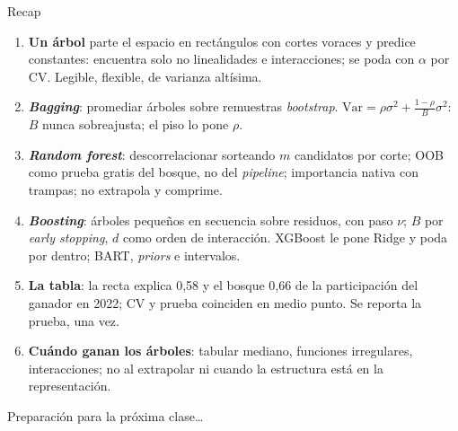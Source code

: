 \documentclass{beamer}
\newcommand{\Var}{\mathrm{Var}}
\newcommand{\1}{\mathbb{I}}
\begin{document}
\begin{frame}{Recap}
\small
\begin{enumerate}\itemsep3pt
  \item \textbf{Un árbol} parte el espacio en rectángulos con cortes voraces y predice constantes: encuentra solo no linealidades e interacciones; se poda con $\alpha$ por CV. Legible, flexible, de varianza altísima.
  \item \textbf{\emph{Bagging}}: promediar árboles sobre remuestras \emph{bootstrap}. $\Var = \rho\sigma^2 + \frac{1-\rho}{B}\sigma^2$: $B$ nunca sobreajusta; el piso lo pone $\rho$.
  \item \textbf{\emph{Random forest}}: descorrelacionar sorteando $m$ candidatos por corte; OOB como prueba gratis del bosque, no del \emph{pipeline}; importancia nativa con trampas; no extrapola y comprime.
  \item \textbf{\emph{Boosting}}: árboles pequeños en secuencia sobre residuos, con paso $\nu$; $B$ por \emph{early stopping}, $d$ como orden de interacción. XGBoost le pone Ridge y poda por dentro; BART, \emph{priors} e intervalos.
  \item \textbf{La tabla}: la recta explica 0,58 y el bosque 0,66 de la participación del ganador en 2022; CV y prueba coinciden en medio punto. Se reporta la prueba, una vez.
  \item \textbf{Cuándo ganan los árboles}: tabular mediano, funciones irregulares, interacciones; no al extrapolar ni cuando la estructura está en la representación.
\end{enumerate}
\end{frame}

\begin{frame}
\vspace{2.0cm}
\Large{Preparación para la próxima clase\ldots}
\end{frame}

\end{document}
